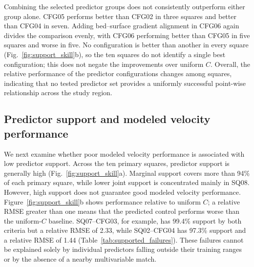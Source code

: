 \documentclass[review,jog]{igs}
\begin{document}

Combining the selected predictor groups does not consistently outperform either group alone. CFG05 performs better than CFG02 in three squares and
better than CFG04 in seven. Adding bed--surface gradient alignment in CFG06
again divides the comparison evenly, with CFG06 performing better than CFG05
in five squares and worse in five. No configuration is better than another in every square (Fig.~\ref{fig:support_skill}b), so the ten squares do not identify a single best configuration; this does not negate the improvements over uniform $C$. Overall, the relative
performance of the predictor configurations changes among squares, indicating
that no tested predictor set provides a uniformly successful point-wise
relationship across the study region.

\subsection{Predictor support and modeled velocity performance}

We next examine whether poor modeled velocity performance is associated with low predictor support. Across the ten primary squares, predictor support is
generally high (Fig.~\ref{fig:support_skill}a). Marginal support covers more
than 94\% of each primary square, while lower joint support is concentrated
mainly in SQ08. However, high support does not guarantee good modeled velocity performance. Figure~\ref{fig:support_skill}b shows performance relative to uniform $C$; a relative RMSE greater than one means that the predicted control performs worse than the uniform-$C$ baseline. SQ07--CFG03, for example, has 99.4\% support by both criteria but a relative RMSE of 2.33, while SQ02--CFG04 has 97.3\% support and a relative RMSE of 1.44 (Table~\ref{tab:supported_failures}). These failures cannot be explained solely by individual predictors falling outside their training ranges or by the absence of a nearby multivariable match.
\end{document}
